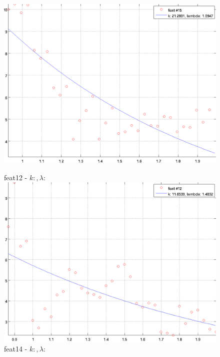 \documentclass[12pt]{report}
\begin{document}
\begin{figure}[H]
\begin{minipage}[t]{0.5\linewidth}
	\includegraphics[scale=\imFeat]{images/feat15}\\
\end{minipage}
\begin{minipage}[t]{0.5\linewidth}
	\centering
	feat12 - $k: , \lambda:  $\\
	\includegraphics[scale=\imFeat]{images/feat12}\\
	feat14 - $k: , \lambda:  $\\

\end{minipage}
\end{figure}
\end{document}
